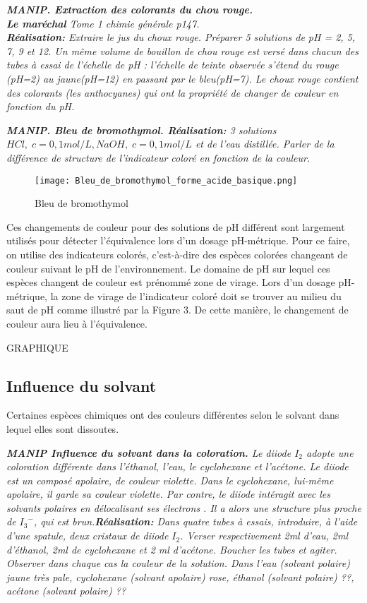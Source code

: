 \documentclass{article}
\begin{document}
\textit{\textbf{MANIP. Extraction des colorants du chou rouge.}\\
\textbf{Le maréchal} Tome 1 chimie générale p147.\\
 \textbf{Réalisation:} Extraire le jus du choux rouge. Préparer 5 solutions de pH = 2, 5, 7, 9 et 12. Un même volume de bouillon de chou rouge est versé dans chacun des tubes à essai de l’échelle de pH : l’échelle de teinte observée s’étend du rouge (pH=2) au jaune(pH=12) en passant par le bleu(pH=7). Le choux rouge contient des colorants (les anthocyanes) qui ont la propriété de changer de couleur en fonction du pH.} \medskip

\textit{\textbf{MANIP. Bleu de bromothymol. Réalisation:} 3 solutions $HCl,\; c=0,1 mol/L, NaOH,\; c=0,1 mol/L$ et de l'eau distillée. Parler de la différence de structure de l'indicateur coloré en fonction de la couleur.}\medskip

\begin{figure}[H]
    \centering
    \texttt{[image: Bleu\_de\_bromothymol\_forme\_acide\_basique.png]}
    \caption{Bleu de bromothymol}
    \label{fig:my_label}
\end{figure}

Ces changements de couleur pour des solutions de pH différent sont largement utilisés pour détecter l’équivalence lors d’un dosage pH-métrique. Pour ce faire, on utilise des indicateurs colorés, c’est-à-dire des espèces colorées changeant de couleur suivant le pH de l’environnement. Le domaine de pH sur lequel ces espèces changent de couleur est prénommé zone de virage. Lors d’un dosage pH-métrique, la zone de virage de l’indicateur coloré doit se trouver au milieu du saut de pH comme illustré par la Figure 3. De cette manière, le changement de couleur aura lieu à l’équivalence.\medskip

GRAPHIQUE

\subsection{Influence du solvant}
Certaines espèces chimiques ont des couleurs différentes selon le solvant dans lequel elles sont dissoutes.\medskip

\textit{\textbf{MANIP Influence du solvant dans la coloration.} Le diiode $I_2$ adopte une coloration différente dans l’éthanol, l’eau, le cyclohexane et l’acétone. Le diiode est un composé apolaire, de couleur violette. Dans le cyclohexane, lui-même apolaire, il garde sa couleur violette. Par contre, le diiode intéragit avec les solvants polaires en délocalisant ses électrons . Il a alors une structure plus proche de ${I_3}^{-}$, qui est brun.\textbf{Réalisation:} Dans quatre tubes à essais, introduire, à l'aide d'une spatule, deux cristaux de diiode $I_2$. Verser respectivement 2ml d'eau, 2ml d'éthanol, 2ml de cyclohexane et 2 ml d'acétone. Boucher les tubes et agiter. Observer dans chaque cas la couleur de la solution. Dans l'eau (solvant polaire) jaune très pale, cyclohexane (solvant apolaire) rose, éthanol (solvant polaire) ??, acétone (solvant polaire) ??}
\end{document}
